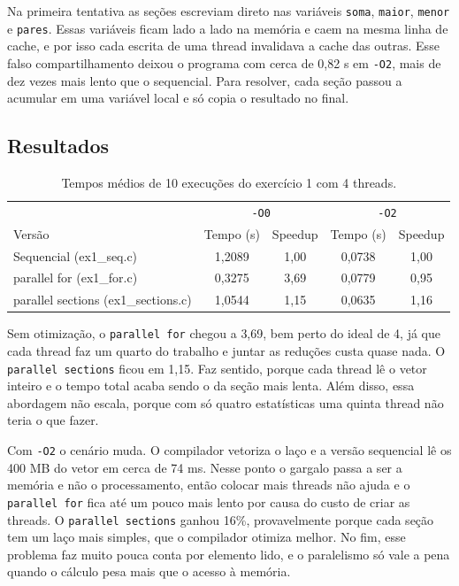 \documentclass[11pt,a4paper]{article}
\begin{document}
Na primeira tentativa as seções escreviam direto nas variáveis \texttt{soma}, \texttt{maior}, \texttt{menor} e \texttt{pares}. Essas variáveis ficam lado a lado na memória e caem na mesma linha de cache, e por isso cada escrita de uma thread invalidava a cache das outras. Esse falso compartilhamento deixou o programa com cerca de 0,82 s em \texttt{-O2}, mais de dez vezes mais lento que o sequencial. Para resolver, cada seção passou a acumular em uma variável local e só copia o resultado no final.

\subsection{Resultados}

\begin{table}[h]
\centering
\begin{tabular}{lcccc}
\toprule
 & \multicolumn{2}{c}{\texttt{-O0}} & \multicolumn{2}{c}{\texttt{-O2}} \\
Versão & Tempo (s) & Speedup & Tempo (s) & Speedup \\
\midrule
Sequencial (ex1\_seq.c) & 1,2089 & 1,00 & 0,0738 & 1,00 \\
parallel for (ex1\_for.c) & 0,3275 & 3,69 & 0,0779 & 0,95 \\
parallel sections (ex1\_sections.c) & 1,0544 & 1,15 & 0,0635 & 1,16 \\
\bottomrule
\end{tabular}
\caption{Tempos médios de 10 execuções do exercício 1 com 4 threads.}
\end{table}

Sem otimização, o \texttt{parallel for} chegou a 3,69, bem perto do ideal de 4, já que cada thread faz um quarto do trabalho e juntar as reduções custa quase nada. O \texttt{parallel sections} ficou em 1,15. Faz sentido, porque cada thread lê o vetor inteiro e o tempo total acaba sendo o da seção mais lenta. Além disso, essa abordagem não escala, porque com só quatro estatísticas uma quinta thread não teria o que fazer.

Com \texttt{-O2} o cenário muda. O compilador vetoriza o laço e a versão sequencial lê os 400 MB do vetor em cerca de 74 ms. Nesse ponto o gargalo passa a ser a memória e não o processamento, então colocar mais threads não ajuda e o \texttt{parallel for} fica até um pouco mais lento por causa do custo de criar as threads. O \texttt{parallel sections} ganhou 16\%, provavelmente porque cada seção tem um laço mais simples, que o compilador otimiza melhor. No fim, esse problema faz muito pouca conta por elemento lido, e o paralelismo só vale a pena quando o cálculo pesa mais que o acesso à memória.
\end{document}
